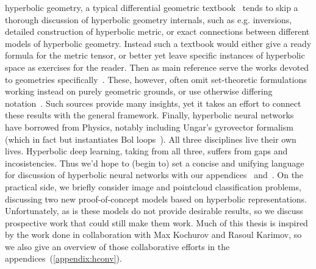 hyperbolic geometry, a typical differential geometric
textbook~\cite{leeRiem,leeSmooth} tends to skip a thorough discussion of
hyperbolic geometry internals, such as e.g.  inversions, detailed
construction of hyperbolic metric, or exact connections between different
models of hyperbolic geometry. Instead such a textbook would either give a
ready formula for the metric tensor, or better yet leave specific instances of
hyperbolic space as exercises for the reader. Then as main reference serve the
works devoted to geometries specifically~\cite{thurstonThree}.
These, however, often omit set-theoretic formulations working instead on purely
geometric grounds, or use otherwise differing
notation~\cite{beardonGeometryDiscrete}. Such sources provide many insights,
yet it takes an effort to connect these results with the general framework.
Finally, hyperbolic neural networks have borrowed from Physics, notably
including Ungar's gyrovector formalism (which in fact but instantiates Bol
loops~\cite{sabinin1995gyrogroups}).  All three disciplines live their own
lives. Hyperbolic deep learning, taking from all three, suffers from gaps and
incosistencies. Thus we'd hope to (begin to) set a concise and unifying
language for discussion of hyperbolic neural networks with our
appendices~ and~.  On
the practical side, we briefly consider image and pointcloud classification
problems, discussing two new proof-of-concept models based on hyperbolic
representations.  Unfortunately, as is these models do not provide desirable
results, so we discuss prospective work that could still make them work.  Much
of this thesis is inspired by the work done in collaboration with Max Kochurov
and Rasoul Karimov, so we also give an overview of those collaborative efforts
in the appendices~(\autoref{appendix:hconv}).
